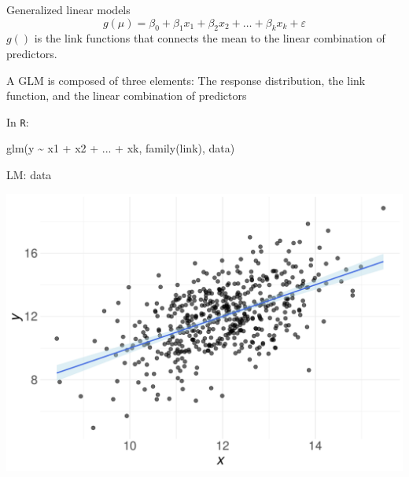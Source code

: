 \documentclass[
  ignorenonframetext,
]{beamer}
\newenvironment{Shaded}{\begin{snugshade}}{\end{snugshade}}
\newcommand{\FunctionTok}[1]{\textcolor[rgb]{0.39,0.29,0.61}{#1}}
\newcommand{\NormalTok}[1]{\textcolor[rgb]{0.12,0.11,0.11}{#1}}
\newcommand{\SpecialCharTok}[1]{\textcolor[rgb]{0.24,0.68,0.91}{#1}}
\begin{document}
\begin{frame}[fragile]{Generalized linear models}
\protect\hypertarget{generalized-linear-models}{}
\[g(\mu) = \beta_0 + \beta_1x_1 + \beta_2x_2 + \ldots + \beta_kx_k + \varepsilon\]
\(g()\) is the link functions that connects the mean to the linear
combination of predictors.

A GLM is composed of three elements: The response distribution, the link
function, and the linear combination of predictors

In \texttt{R}:

\begin{Shaded}
\begin{Highlighting}[]
\FunctionTok{glm}\NormalTok{(y }\SpecialCharTok{\textasciitilde{}}\NormalTok{ x1 }\SpecialCharTok{+}\NormalTok{ x2 }\SpecialCharTok{+}\NormalTok{ ... }\SpecialCharTok{+}\NormalTok{ xk, }\FunctionTok{family}\NormalTok{(link), data)}
\end{Highlighting}
\end{Shaded}
\end{frame}

\begin{frame}{LM: data}
\protect\hypertarget{lm-data}{}
\begin{center}\includegraphics[width=0.9\linewidth]{Practice_files/figure-beamer/unnamed-chunk-99-1} \end{center}
\end{frame}
\end{document}
